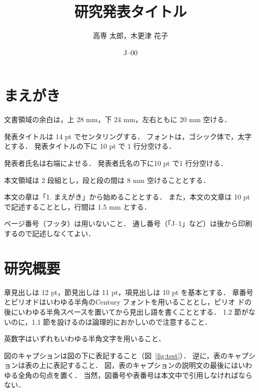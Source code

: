 \documentclass[twocolumn]{jarticle}
\begin{document}
\pagestyle{empty}

\date{J--00}  %
\title{研究発表タイトル}
\author{高専 太郎，木更津 花子}
\maketitle

\suppressfloats[t]


\section{まえがき}

文書領域の余白は，上 28 mm，下 24 mm，左右ともに 20 mm 空ける．

発表タイトルは 14 pt でセンタリングする．
%
フォントは，ゴシック体で，太字とする．
%
発表タイトルの下に 10 pt で 1 行分空ける．

発表者氏名は右端によせる．
%
発表者氏名の下に10 pt で1 行分空ける．

本文領域は 2 段組とし，段と段の間は 8 mm 空けることとする．

本文の章は「1. まえがき」から始めることとする．
%
また，本文の文章は 10 pt で記述することとし，行間は 1.5 mm とする．

ページ番号（フッタ）は用いないこと．
%
通し番号（「J--1」など）は後から印刷するので記述しなくてよい．


\section{研究概要}

章見出しは 12 pt，節見出しは 11 pt，項見出しは 10 pt を基本とする．
%
章番号とピリオドはいわゆる半角のCentury フォントを用いることとし，ピリオ
ドの後にいわゆる半角スペースを置いてから見出し語を書くこととする．
%
1.2 節がないのに，1.1 節を設けるのは論理的におかしいので注意すること．

英数字はいずれもいわゆる半角文字を用いること．

図のキャプションは図の下に表記すること（図~\ref{fig:test}）．
%
逆に，表のキャプションは表の上に表記すること．
%
図，表のキャプションの説明文の最後にはいわゆる全角の句点を置く．
%
当然，図番号や表番号は本文中で引用しなければならない．
\end{document}
